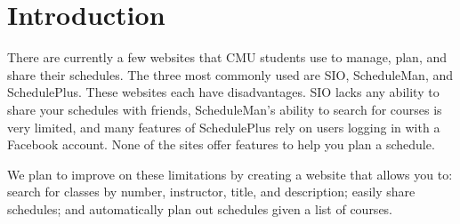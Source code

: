 \section{Introduction}
\setcounter{page}{1}  %
There are currently a few websites that CMU students use to manage, plan, and
share their schedules. The three most commonly used are SIO, ScheduleMan, and
SchedulePlus. These websites each have disadvantages. SIO lacks any ability to
share your schedules with friends, ScheduleMan's ability to search for courses
is very limited, and many features of SchedulePlus rely on users logging in with
a Facebook account.  None of the sites offer features to help you plan
a schedule.

We plan to improve on these limitations by creating a website that allows you
to: search for classes by number, instructor, title, and description; easily
share schedules; and automatically plan out schedules given a list of courses.
